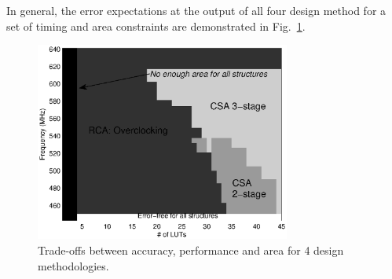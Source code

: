 \documentclass[journal]{IEEEtran}
\begin{document}
In general, the error expectations at the output of all four design method for a set of timing and area constraints are demonstrated in Fig.~\ref{Tradeoff}.
\begin{figure}[htbp]
  \centering
  \includegraphics[width=3.3in]{./Figures/Tradeoff.eps}
  \caption{Trade-offs between accuracy, performance and area for 4 design methodologies.}
  \label{Tradeoff}
\end{figure}


%
%

\end{document}

